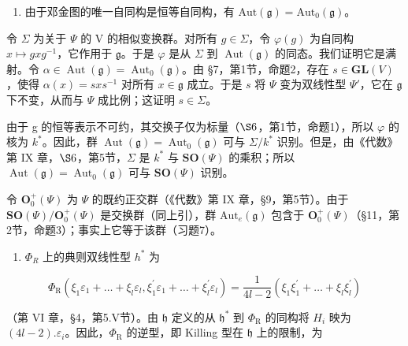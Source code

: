 \begin{enumerate}
\def\labelenumi{(\Roman{enumi})}
\setcounter{enumi}{6}
\tightlist
\item
由于邓金图的唯一自同构是恒等自同构，有 \(\mathrm{Aut}(\mathfrak{g}) = \mathrm{Aut}_0(\mathfrak{g})\)。
\end{enumerate}

令 \(\Sigma\) 为关于 \(\Psi\) 的 V 的相似变换群。对所有 \(g \in \Sigma\)，令 \(\varphi(g)\) 为自同构 \(x \mapsto gxg^{-1}\)，它作用于 \(\mathfrak{g}\)。于是 \(\varphi\) 是从 \(\Sigma\) 到 \(\operatorname{Aut}(\mathfrak{g})\) 的同态。我们证明它是满射。令 \(\alpha \in \operatorname{Aut}(\mathfrak{g}) = \operatorname{Aut}_0(\mathfrak{g})\)。由 §7，第1节，命题2，存在 \(s \in \mathbf{GL}(V)\)，使得 \(\alpha(x) = sxs^{-1}\) 对所有 \(x \in \mathfrak{g}\) 成立。于是 \(s\) 将 \(\Psi\) 变为双线性型 \(\Psi'\)，它在 \(\mathfrak{g}\) 下不变，从而与 \(\Psi\) 成比例；这证明 \(s \in \Sigma\)。

由于 g 的恒等表示不可约，其交换子仅为标量（\(\S6\)，第1节，命题1），所以 \(\varphi\) 的核为 \(k^{*}\)。因此，群 \(\operatorname{Aut}(\mathfrak{g}) = \operatorname{Aut}_{0}(\mathfrak{g})\) 可与 \(\Sigma/k^{*}\) 识别。但是，由《代数》第 IX 章，\(\S6\)，第5节，\(\Sigma\) 是 \(k^{*}\) 与 \(\mathbf{SO}(\Psi)\) 的乘积；所以 \(\operatorname{Aut}(\mathfrak{g}) = \operatorname{Aut}_{0}(\mathfrak{g})\) 可与 \(\mathbf{SO}(\Psi)\) 识别。

令 \(\mathbf{O}_0^+(\varPsi)\) 为 \(\varPsi\) 的既约正交群（《代数》第 IX 章，§9，第5节）。由于 \(\mathbf{SO}(\varPsi)/\mathbf{O}_0^+(\varPsi)\) 是交换群（同上引），群 \(\mathrm{Aut}_e(\mathfrak{g})\) 包含于 \(\mathbf{O}_0^+(\varPsi)\)（§11，第2节，命题3）；事实上它等于该群（习题7）。

\begin{enumerate}
\def\labelenumi{(\Roman{enumi})}
\setcounter{enumi}{7}
\tightlist
\item
\(\Phi_{R}\) 上的典则双线性型 \(h^{*}\) 为
\end{enumerate}

\[
\varPhi_ {\mathrm{R}} (\xi_ {1} \varepsilon_ {1} + \dots + \xi_ {l} \varepsilon_ {l}, \xi_ {1} ^ {\prime} \varepsilon_ {1} + \dots + \xi_ {l} ^ {\prime} \varepsilon_ {l}) = \frac {1}{4 l - 2} (\xi_ {1} \xi_ {1} ^ {\prime} + \dots + \xi_ {l} \xi_ {l} ^ {\prime})
\]

（第 VI 章，§4，第5.V节）。由 \(\mathfrak{h}\) 定义的从 \(\mathfrak{h}^*\) 到 \(\varPhi_{\mathrm{R}}\) 的同构将 \(H_{i}\) 映为 \((4l - 2).\varepsilon_{i}\)。因此，\(\varPhi_{\mathrm{R}}\) 的逆型，即 Killing 型在 \(\mathfrak{h}\) 上的限制，为

